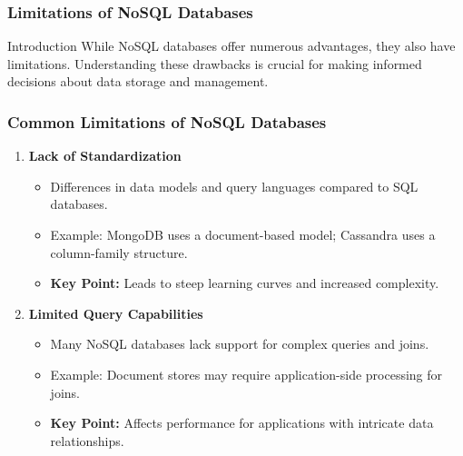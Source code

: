 \documentclass[aspectratio=169]{beamer}
\begin{document}
\begin{frame}[fragile]
    \frametitle{Limitations of NoSQL Databases}
    \begin{block}{Introduction}
        While NoSQL databases offer numerous advantages, they also have limitations. Understanding these drawbacks is crucial for making informed decisions about data storage and management.
    \end{block}
\end{frame}

\begin{frame}[fragile]
    \frametitle{Common Limitations of NoSQL Databases}
    \begin{enumerate}
        \item \textbf{Lack of Standardization}
            \begin{itemize}
                \item Differences in data models and query languages compared to SQL databases.
                \item Example: MongoDB uses a document-based model; Cassandra uses a column-family structure.
                \item \textbf{Key Point:} Leads to steep learning curves and increased complexity.
            \end{itemize}
        \item \textbf{Limited Query Capabilities}
            \begin{itemize}
                \item Many NoSQL databases lack support for complex queries and joins.
                \item Example: Document stores may require application-side processing for joins.
                \item \textbf{Key Point:} Affects performance for applications with intricate data relationships.
            \end{itemize}
    \end{enumerate}
\end{frame}
\end{document}
